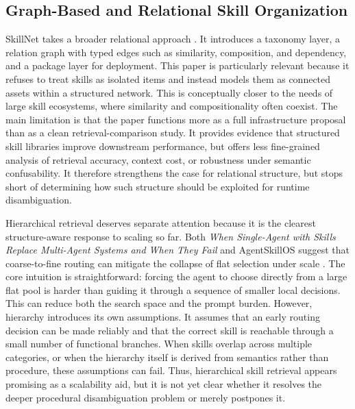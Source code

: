 \documentclass[a4paper]{article}
\begin{document}
\subsection{Graph-Based and Relational Skill Organization}
SkillNet takes a broader relational approach \cite{liang2026skillnet}. It introduces a taxonomy layer, a relation graph with typed edges such as similarity, composition, and dependency, and a package layer for deployment. This paper is particularly relevant because it refuses to treat skills as isolated items and instead models them as connected assets within a structured network. This is conceptually closer to the needs of large skill ecosystems, where similarity and compositionality often coexist. The main limitation is that the paper functions more as a full infrastructure proposal than as a clean retrieval-comparison study. It provides evidence that structured skill libraries improve downstream performance, but offers less fine-grained analysis of retrieval accuracy, context cost, or robustness under semantic confusability. It therefore strengthens the case for relational structure, but stops short of determining how such structure should be exploited for runtime disambiguation.

Hierarchical retrieval deserves separate attention because it is the clearest structure-aware response to scaling so far. Both \emph{When Single-Agent with Skills Replace Multi-Agent Systems and When They Fail} and AgentSkillOS suggest that coarse-to-fine routing can mitigate the collapse of flat selection under scale \cite{li2026singleagent, li2026agentskillos}. The core intuition is straightforward: forcing the agent to choose directly from a large flat pool is harder than guiding it through a sequence of smaller local decisions. This can reduce both the search space and the prompt burden. However, hierarchy introduces its own assumptions. It assumes that an early routing decision can be made reliably and that the correct skill is reachable through a small number of functional branches. When skills overlap across multiple categories, or when the hierarchy itself is derived from semantics rather than procedure, these assumptions can fail. Thus, hierarchical skill retrieval appears promising as a scalability aid, but it is not yet clear whether it resolves the deeper procedural disambiguation problem or merely postpones it.
\end{document}
